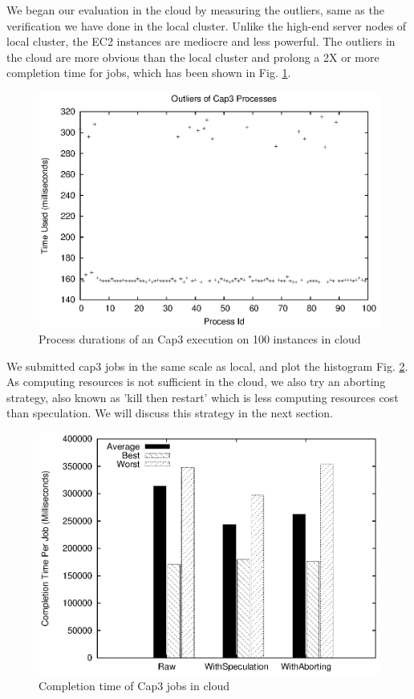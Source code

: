 We began our evaluation in the cloud by measuring the outliers, same as the verification we have done in the local cluster. Unlike the high-end server nodes of local cluster, the EC2 instances are mediocre and less powerful. The outliers in the cloud are more obvious than the local cluster and prolong a 2X or more completion time for jobs, which has been shown in Fig. \ref{figure:outlier_cloud}.

\begin{figure}
\centering
\includegraphics[width=0.9\columnwidth]{figures/cloud_outliers.eps}
\caption{Process durations of an Cap3 execution on 100 instances in cloud}
\label{figure:outlier_cloud}
\end{figure}

We submitted cap3 jobs in the same scale as local, and plot the histogram Fig. \ref{figure:completiontime_cap3_cloud}. As computing resources is not sufficient in the cloud, we also try an aborting strategy, also known as 'kill then restart' which is less computing resources cost than speculation. We will discuss this strategy in the next section.

\begin{figure}
\centering
\includegraphics[width=0.9\columnwidth]{figures/cloud_completiontime_cap3.eps}
\caption{Completion time of Cap3 jobs in cloud}
\label{figure:completiontime_cap3_cloud}
\end{figure}

